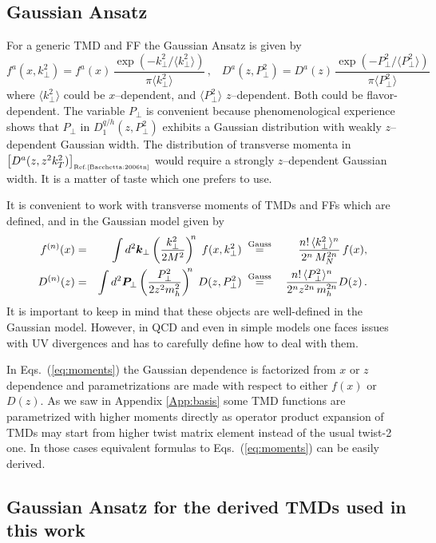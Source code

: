 \documentclass[a4paper,11pt]{article}
\newcommand{\be}{\begin{equation}}
\newcommand{\ee}{\end{equation}}
\newcommand{\la}{\langle}
\newcommand{\ra}{\rangle}
\def\bfkperp{{\bm k}_\perp}
\def\bfpperp{{\bm P}_\perp}
\def\kperp{k_\perp}
\def\pperp{P_\perp}
\begin{document}
\subsection{Gaussian Ansatz}

For a generic TMD and FF the Gaussian Ansatz is given by 
\be
    f^a(x,\kperp^2)=
    f^a(x)\,\frac{\exp(-\kperp^2/\la\kperp^2\ra)}{\pi\la\kperp^2\ra}\,,\;\;\;
    D^a(z,\pperp^2)=
    D^a(z)\,\frac{\exp(-\pperp^2/\la\pperp^2\ra)}{\pi\la\pperp^2\ra}
\ee
where 
$\la\kperp^2\ra$ could be $x$--dependent,  
and $\la\pperp^2\ra$ $z$--dependent. 
Both could be flavor-dependent.
The variable $\pperp$ is convenient because phenomenological experience 
shows that $\pperp$ in $D_1^{q/h}(z,\pperp^2)$ exhibits a Gaussian distribution 
with weakly $z$--dependent Gaussian width. The distribution of transverse 
momenta in $\left[D^a(z,z^2 k_T^2)\right]_{\mbox{\tiny Ref.\cite{Bacchetta:2006tn}}}$ 
would require a strongly $z$--dependent Gaussian width. It is a matter of 
taste which one prefers to use.

It is convenient to work with transverse moments of TMDs and FFs
which are defined, and in the Gaussian model given by
\begin{alignat}{6}
	f^{(n)}(x) &=& \int d^2\bfkperp
	\left(\frac{\kperp^2}{2M^2}\right)^{\!\!n}\; f(x, \kperp^2)
	\;&\stackrel{\rm Gauss}{=}&\;
	\frac{n!\,\la \kperp^2\ra^n}{ 2^n\,M_N^{2n}}\, f(x),\;\;\;\nonumber\\
	D^{(n)}(z) &=& \int d^2\bfpperp
	\left(\frac{\pperp^2}{2 z^2 m_h^2}\right)^{\!\!n}\; D(z, \pperp^2)
	\;&\stackrel{\rm Gauss}{=}&\;
	\frac{n!\,\la \pperp^2\ra^n}{ 2^n_{ }z^{2n}_{ }\,m_{h}^{2n}} D(z)\,. \;\;\;
	\label{eq:moments}
\end{alignat}
It is important to keep in mind that these objects are well-defined
in the Gaussian model. However, in QCD and even in simple models
\cite{Avakian:2010br,Schweitzer:2012hh} one faces issues with UV 
divergences and has to carefully define how to deal with them. 

In Eqs.~(\ref{eq:moments}) the Gaussian dependence is factorized 
from $x$ or $z$ dependence and parametrizations are made with 
respect to either $f(x)$ or $D(z)$. As we saw in Appendix 
\ref{App:basis} some TMD functions are parametrized with higher 
moments directly as operator product expansion of TMDs may start 
from higher twist matrix element instead of the usual twist-2 one. 
In those cases equivalent formulas to Eqs.~(\ref{eq:moments}) can 
be easily derived.

\subsection{Gaussian Ansatz for the derived TMDs used in this work}
\label{App-B:Gauss-Ansatz-non-basis-TMDs}
\end{document}
